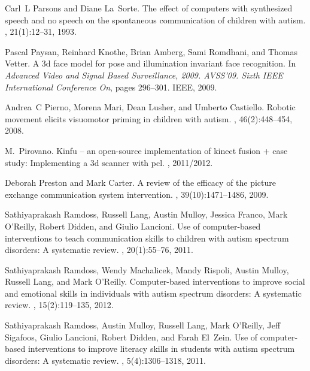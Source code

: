 \documentclass{ut-thesis}
\begin{document}
\begin{thebibliography}{100}
Carl~L Parsons and Diane La~Sorte.
\newblock The effect of computers with synthesized speech and no speech on the
  spontaneous communication of children with autism.
,
  21(1):12--31, 1993.

Pascal Paysan, Reinhard Knothe, Brian Amberg, Sami Romdhani, and Thomas Vetter.
\newblock A 3d face model for pose and illumination invariant face recognition.
\newblock In {\em Advanced Video and Signal Based Surveillance, 2009. AVSS'09.
  Sixth IEEE International Conference On}, pages 296--301. IEEE, 2009.

Andrea~C Pierno, Morena Mari, Dean Lusher, and Umberto Castiello.
\newblock Robotic movement elicits visuomotor priming in children with autism.
, 46(2):448--454, 2008.

M.~Pirovano.
\newblock Kinfu – an open-source implementation of kinect fusion + case
  study: Implementing a 3d scanner with pcl.
, 2011/2012.

Deborah Preston and Mark Carter.
\newblock A review of the efficacy of the picture exchange communication system
  intervention.
,
  39(10):1471--1486, 2009.

Sathiyaprakash Ramdoss, Russell Lang, Austin Mulloy, Jessica Franco, Mark
  O’Reilly, Robert Didden, and Giulio Lancioni.
\newblock Use of computer-based interventions to teach communication skills to
  children with autism spectrum disorders: A systematic review.
, 20(1):55--76, 2011.

Sathiyaprakash Ramdoss, Wendy Machalicek, Mandy Rispoli, Austin Mulloy, Russell
  Lang, and Mark O'Reilly.
\newblock Computer-based interventions to improve social and emotional skills
  in individuals with autism spectrum disorders: A systematic review.
, 15(2):119--135, 2012.

Sathiyaprakash Ramdoss, Austin Mulloy, Russell Lang, Mark O’Reilly, Jeff
  Sigafoos, Giulio Lancioni, Robert Didden, and Farah El~Zein.
\newblock Use of computer-based interventions to improve literacy skills in
  students with autism spectrum disorders: A systematic review.
, 5(4):1306--1318, 2011.


\end{thebibliography}
\end{document}
